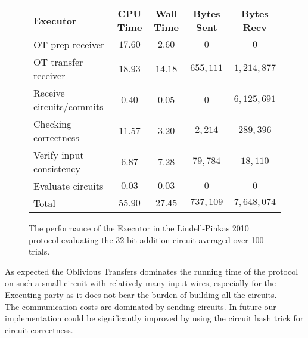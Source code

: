 \documentclass[ %
                    author={Nicholas Tutte},
                supervisor={Prof. Nigel Smart},
                    degree={MEng},
                     title={Secure Two Party Computation},
                  subtitle={A practical comparison of recent protocols},
                      type={Research - GG1K},
                      year={2015} ]{dissertation}
\begin{document}
				\begin{figure}[!ht]
					\begin{tabular}{| p{4.3cm} | c c c c |}
						\hline
						\textbf{Executor} & \textbf{CPU Time} & \textbf{Wall Time} & \textbf{Bytes Sent} & \textbf{Bytes Recv} \\
						\thickhline
						OT prep receiver & $17.60$ & $2.60$ & $0$ & $0$ \\
						\hline
						OT transfer receiver & $18.93$ & $14.18$ & $655,111$ & $1,214,877$ \\
						\hline
						Receive circuits/commits & $0.40$ & $0.05$ & $0$ & $6,125,691$ \\
						\hline
						Checking correctness & $11.57$ & $3.20$ & $2,214$ & $289,396$ \\
						\hline
						Verify input consistency & $6.87$ & $7.28$ & $79,784$ & $18,110$ \\
						\hline
						Evaluate circuits & $0.03$ & $0.03$ & $0$ & $0$ \\
						\thickhline
						Total & $55.90$ & $27.45$ & $737,109$ & $7,648,074$ \\
						\hline
					\end{tabular}
					\caption{The performance of the Executor in the Lindell-Pinkas 2010 protocol evaluating the 32-bit addition circuit averaged over 100 trials.\label{table:LP_2010_Add_Executor}}
				\end{figure}
				\FloatBarrier

				As expected the Oblivious Transfers dominates the running time of the protocol on such a small circuit with relatively many input wires, especially for the Executing party as it does not bear the burden of building all the circuits.\\

				The communication costs are dominated by sending circuits. In future our implementation could be significantly improved by using the circuit hash trick for circuit correctness.\\
\end{document}
